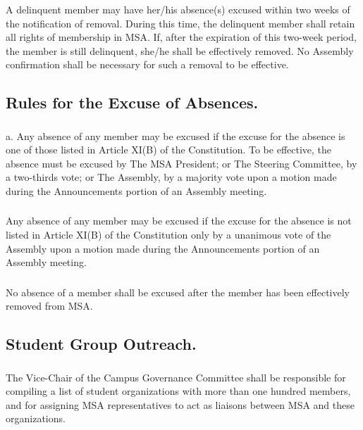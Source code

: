 \subsubsection{}
A delinquent member may have her/his absence(s) excused within two weeks of the notification of removal.  During this time, the delinquent member shall retain all rights of membership in MSA.  If, after the expiration of this two-week period, the member is still delinquent, she/he shall be effectively removed.  No Assembly confirmation shall be necessary for such a removal to be effective.

\subsection{Rules for the Excuse of Absences.}
\subsubsection{}
a.	Any absence of any member may be excused if the excuse for the absence is one of those listed in Article XI(B) of the Constitution.  To be effective, the absence must be excused by
\subsubsubsection{}
The MSA President; or
\subsubsubsection{}
The Steering Committee, by a two-thirds vote; or
\subsubsubsection{}
The Assembly, by a majority vote upon a motion made during the Announcements portion of an Assembly meeting.

\subsubsection{}
Any absence of any member may be excused if the excuse for the absence is not listed in Article XI(B) of the Constitution only by a unanimous vote of the Assembly upon a motion made during the Announcements portion of an Assembly meeting.

\subsubsection{}
No absence of a member shall be excused after the member has been effectively removed from MSA.


\subsection{Student Group Outreach.}  

\subsubsection{}
The Vice-Chair of the Campus Governance Committee shall be responsible for compiling a list of student organizations with more than one hundred members, and for assigning MSA representatives to act as liaisons between MSA and these organizations.

